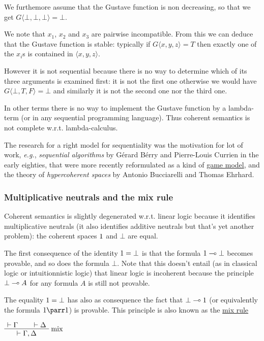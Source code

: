 We furthemore assume that the Gustave function is non decreasing, so
that we get \(G\langle\bot,\bot,\bot\rangle = \bot\).

We note that \(x_1\), \(x_2\) and \(x_3\) are pairwise incompatible.
From this we can deduce that the Gustave function is stable: typically
if \(G\langle x,y,z\rangle = T\) then exactly one of the \(x_i\)s is
contained in \(\langle x, y, z\rangle\).

However it is not sequential because there is no way to determine which
of its three arguments is examined first: it is not the first one
otherwise we would have \(G\langle\bot, T, F\rangle = \bot\) and
similarly it is not the second one nor the third one.

In other terms there is no way to implement the Gustave function by a
lambda-term (or in any sequential programming language). Thus coherent
semantics is not complete w.r.t. lambda-calculus.

The research for a right model for sequentiality was the motivation for
lot of work, \emph{e.g.}, \emph{sequential algorithms} by Gérard Bérry
and Pierre-Louis Currien in the early eighties, that were more recently
reformulated as a kind of \href{Game_semantics}{game model}, and the
theory of \emph{hypercoherent spaces} by Antonio Bucciarelli and Thomas
Ehrhard.

\subsubsection{Multiplicative neutrals and the mix
rule}\label{multiplicative-neutrals-and-the-mix-rule}

Coherent semantics is slightly degenerated w.r.t. linear logic because
it identifies multiplicative neutrals (it also identifies additive
neutrals but that's yet another problem): the coherent spaces \(1\)
and \(\bot\) are equal.

The first consequence of the identity \(1 = \bot\) is that the
formula \(1\multimap\bot\) becomes provable, and so does the formula
\(\bot\). Note that this doesn't entail (as in classical logic or
intuitionnistic logic) that linear logic is incoherent because the
principle \(\bot\multimap A\) for any formula \(A\) is still not provable.

The equality \(1 = \bot\) has also as consequence the fact that
\(\bot\multimap1\) (or equivalently the formula \(\one\parr\one\)) is
provable. This principle is also known as the \href{Mix}{mix rule}

\(\AxRule{\vdash \Gamma}
\AxRule{\vdash \Delta}
\LabelRule{\rulename{mix}}
\BinRule{\vdash \Gamma,\Delta}
\DisplayProof\)

